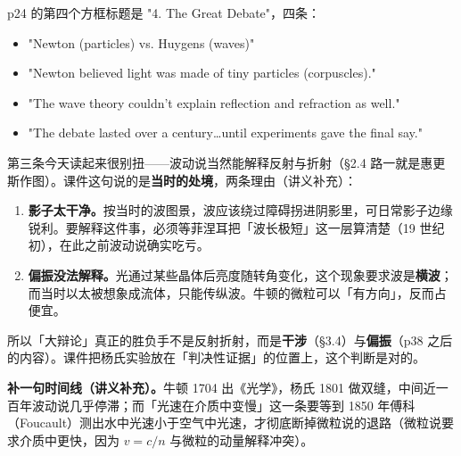 \documentclass[11pt]{ctexart}
\newcommand{\cpage}[1]{\textsf{p#1}}
\begin{document}


\cpage{24} 的第四个方框标题是 "4. The Great Debate"，四条：

\begin{itemize}
\item "Newton (particles) vs. Huygens (waves)"
\item "Newton believed light was made of tiny particles (corpuscles)."
\item "The wave theory couldn't explain reflection and refraction as well."
\item "The debate lasted over a century\ldots until experiments gave the final say."
\end{itemize}

第三条今天读起来很别扭——波动说当然能解释反射与折射（§2.4 路一就是惠更斯作图）。课件这句说的是\textbf{当时的处境}，两条理由（讲义补充）：

\begin{enumerate}
\item \textbf{影子太干净。}按当时的波图景，波应该绕过障碍拐进阴影里，可日常影子边缘锐利。要解释这件事，必须等菲涅耳把「波长极短」这一层算清楚（19 世纪初），在此之前波动说确实吃亏。
\item \textbf{偏振没法解释。}光通过某些晶体后亮度随转角变化，这个现象要求波是\textbf{横波}；而当时以太被想象成流体，只能传纵波。牛顿的微粒可以「有方向」，反而占便宜。
\end{enumerate}

所以「大辩论」真正的胜负手不是反射折射，而是\textbf{干涉}（\S3.4）与\textbf{偏振}（\cpage{38} 之后的内容）。课件把杨氏实验放在「判决性证据」的位置上，这个判断是对的。

\textbf{补一句时间线（讲义补充）。}牛顿 1704 出《光学》，杨氏 1801 做双缝，中间近一百年波动说几乎停滞；而「光速在介质中变慢」这一条要等到 1850 年傅科（Foucault）测出水中光速小于空气中光速，才彻底断掉微粒说的退路（微粒说要求介质中更快，因为 $v=c/n$ 与微粒的动量解释冲突）。

\end{document}
